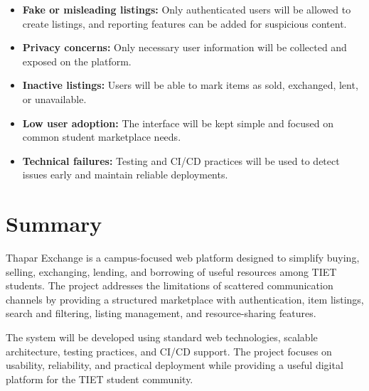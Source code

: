 \documentclass[11pt,a4paper]{article}
\begin{document}
\begin{itemize}[leftmargin=0.7cm]
    \item \textbf{Fake or misleading listings:} Only authenticated users will be allowed to create listings, and reporting features can be added for suspicious content.
    \item \textbf{Privacy concerns:} Only necessary user information will be collected and exposed on the platform.
    \item \textbf{Inactive listings:} Users will be able to mark items as sold, exchanged, lent, or unavailable.
    \item \textbf{Low user adoption:} The interface will be kept simple and focused on common student marketplace needs.
    \item \textbf{Technical failures:} Testing and CI/CD practices will be used to detect issues early and maintain reliable deployments.
\end{itemize}

\section{Summary}
Thapar Exchange is a campus-focused web platform designed to simplify buying, selling, exchanging, lending, and borrowing of useful resources among TIET students. The project addresses the limitations of scattered communication channels by providing a structured marketplace with authentication, item listings, search and filtering, listing management, and resource-sharing features.

The system will be developed using standard web technologies, scalable architecture, testing practices, and CI/CD support. The project focuses on usability, reliability, and practical deployment while providing a useful digital platform for the TIET student community.
\end{document}
